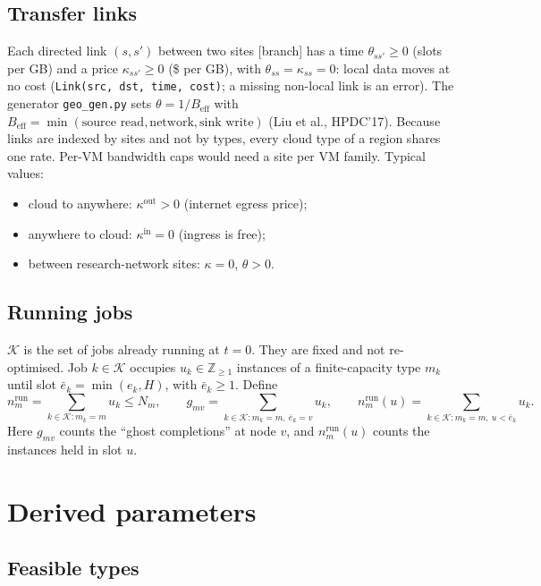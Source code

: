 \documentclass[11pt,a4paper]{article}
\newcommand{\K}{\mathcal{K}}
\newcommand{\Z}{\mathbb{Z}}
\newcommand{\code}[1]{\texttt{#1}}
\newcommand{\pin}{\mathrm{in}}
\newcommand{\pout}{\mathrm{out}}
\newcommand{\run}{\mathrm{run}}
\newcommand{\status}[1]{\textsf{\small[#1]}}
\begin{document}
\subsection{Transfer links}\label{sec:links}

Each directed link $(s,s')$ between two sites \status{branch} has a time
$\theta_{ss'}\ge0$ (slots per GB) and a price $\kappa_{ss'}\ge0$ (\$ per GB),
with $\theta_{ss}=\kappa_{ss}=0$: local data moves at no cost
(\code{Link(src, dst, time, cost)}; a missing non-local link is an error). The
generator \code{geo\_gen.py} sets $\theta=1/B_{\mathrm{eff}}$ with
$B_{\mathrm{eff}}=\min(\text{source read},\text{network},\text{sink write})$
(Liu et al., HPDC'17). Because links are indexed by sites and not by types,
every cloud type of a region shares one rate. Per-VM bandwidth caps would
need a site per VM family. Typical values:
\begin{itemize}[leftmargin=*]
\item cloud to anywhere: $\kappa^\pout>0$ (internet egress price);
\item anywhere to cloud: $\kappa^\pin=0$ (ingress is free);
\item between research-network sites: $\kappa=0$, $\theta>0$.
\end{itemize}

\subsection{Running jobs}

$\K$ is the set of jobs already running at $t=0$. They are fixed and not
re-optimised. Job $k\in\K$ occupies $u_k\in\Z_{\ge1}$ instances of a
finite-capacity type $m_k$ until slot $\bar e_k=\min(e_k,H)$, with $\bar e_k\ge1$.
Define
\[
  n^\run_m=\sum_{k\in\K:m_k=m}u_k\le N_m,
  \qquad
  g_{mv}=\sum_{k\in\K:m_k=m,\ \bar e_k=v}u_k,
  \qquad
  n^\run_m(u)=\sum_{k\in\K:m_k=m,\ u<\bar e_k}u_k .
\]
Here $g_{mv}$ counts the ``ghost completions'' at node $v$, and $n^\run_m(u)$
counts the instances held in slot $u$.

\section{Derived parameters}\label{sec:derived}

\subsection{Feasible types}
\end{document}
